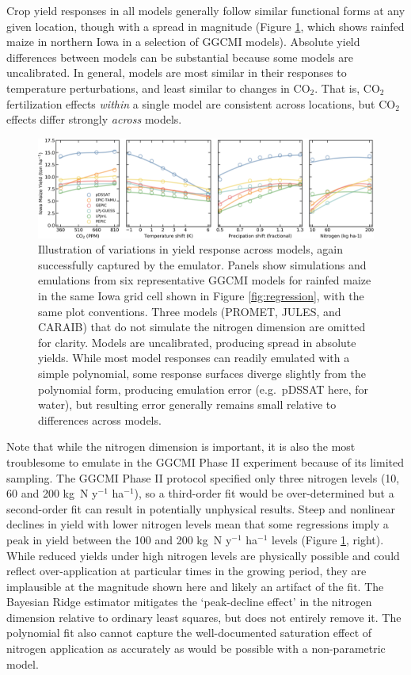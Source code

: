 \documentclass[gmd, manuscript]{copernicus} %
\begin{document}
Crop yield responses in all models generally follow similar functional forms at any given location, though with a spread in magnitude (Figure \ref{fig:regression_2}, which shows rainfed maize in northern Iowa in a selection of GGCMI models). 
Absolute yield differences between models can be substantial because some models are uncalibrated.
In general, models are most similar in their responses to temperature perturbations, and least similar to changes in CO$_2$. 
That is, CO$_2$ fertilization effects \textit{within} a single model are consistent across locations, but CO$_2$ effects differ strongly \textit{across} models. 

\begin{figure}[h!!]
\centering
    \includegraphics[width=16.3cm]{figures/regression_example_2.png}
    \caption{
    Illustration of variations in yield response across models, again successfully captured by the emulator. 
    Panels show simulations and emulations from six representative GGCMI models for rainfed maize in the same Iowa grid cell shown in Figure \ref{fig:regression}, with the same plot conventions. 
    Three models (PROMET, JULES, and CARAIB) that do not simulate the nitrogen dimension are omitted for clarity. 
    Models are uncalibrated, producing spread in absolute yields. 
    While most model responses can readily emulated with a simple polynomial, some response surfaces diverge slightly from the polynomial form, producing emulation error (e.g.\ pDSSAT here, for water), but 
    resulting error generally remains small relative to differences across models.
    }
   \label{fig:regression_2}
\end{figure}

Note that while the nitrogen dimension is important, it is also the most troublesome to emulate in the GGCMI Phase II experiment because of its limited sampling. 
The GGCMI Phase II protocol specified only three nitrogen levels (10, 60 and 200 kg~N y$^{-1}$ ha$^{-1}$), so a third-order fit would be over-determined but a second-order fit can result in potentially unphysical results. 
Steep and nonlinear declines in yield with lower nitrogen levels mean that some regressions imply a peak in yield between the 100 and 200 kg~N y$^{-1}$ ha$^{-1}$ levels (Figure \ref{fig:regression_2}, right). 
While reduced yields under high nitrogen levels are physically possible and could reflect over-application at particular times in the growing period, they are implausible at the magnitude shown here and likely an artifact of the fit. 
The Bayesian Ridge estimator mitigates the `peak-decline effect' in the nitrogen dimension relative to ordinary least squares, but does not entirely remove it. 
The polynomial fit also cannot capture the well-documented saturation effect of nitrogen application \citep[e.g.][]{Torsten77} as accurately as would be possible with a non-parametric model. 
\end{document}
